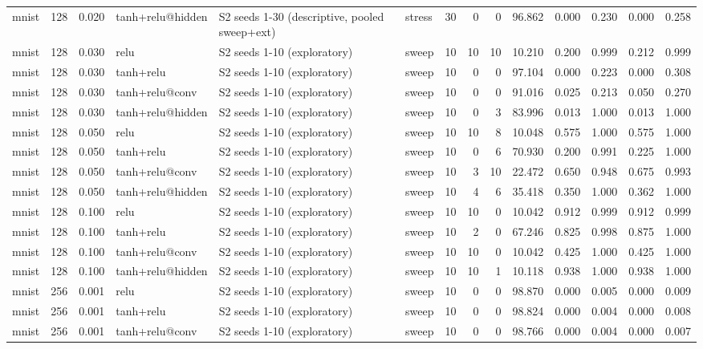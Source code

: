 \begin{table}[htbp]
{\begin{tabular}{@{}lrrlllrrrrrrrr@{}}
mnist & 128 & 0.020 & tanh+relu@hidden & S2 seeds 1-30 (descriptive, pooled sweep+ext) & stress & 30 & 0 & 0 & 96.862 & 0.000 & 0.230 & 0.000 & 0.258 \\
mnist & 128 & 0.030 & relu & S2 seeds 1-10 (exploratory) & sweep & 10 & 10 & 10 & 10.210 & 0.200 & 0.999 & 0.212 & 0.999 \\
mnist & 128 & 0.030 & tanh+relu & S2 seeds 1-10 (exploratory) & sweep & 10 & 0 & 0 & 97.104 & 0.000 & 0.223 & 0.000 & 0.308 \\
mnist & 128 & 0.030 & tanh+relu@conv & S2 seeds 1-10 (exploratory) & sweep & 10 & 0 & 0 & 91.016 & 0.025 & 0.213 & 0.050 & 0.270 \\
mnist & 128 & 0.030 & tanh+relu@hidden & S2 seeds 1-10 (exploratory) & sweep & 10 & 0 & 3 & 83.996 & 0.013 & 1.000 & 0.013 & 1.000 \\
mnist & 128 & 0.050 & relu & S2 seeds 1-10 (exploratory) & sweep & 10 & 10 & 8 & 10.048 & 0.575 & 1.000 & 0.575 & 1.000 \\
mnist & 128 & 0.050 & tanh+relu & S2 seeds 1-10 (exploratory) & sweep & 10 & 0 & 6 & 70.930 & 0.200 & 0.991 & 0.225 & 1.000 \\
mnist & 128 & 0.050 & tanh+relu@conv & S2 seeds 1-10 (exploratory) & sweep & 10 & 3 & 10 & 22.472 & 0.650 & 0.948 & 0.675 & 0.993 \\
mnist & 128 & 0.050 & tanh+relu@hidden & S2 seeds 1-10 (exploratory) & sweep & 10 & 4 & 6 & 35.418 & 0.350 & 1.000 & 0.362 & 1.000 \\
mnist & 128 & 0.100 & relu & S2 seeds 1-10 (exploratory) & sweep & 10 & 10 & 0 & 10.042 & 0.912 & 0.999 & 0.912 & 0.999 \\
mnist & 128 & 0.100 & tanh+relu & S2 seeds 1-10 (exploratory) & sweep & 10 & 2 & 0 & 67.246 & 0.825 & 0.998 & 0.875 & 1.000 \\
mnist & 128 & 0.100 & tanh+relu@conv & S2 seeds 1-10 (exploratory) & sweep & 10 & 10 & 0 & 10.042 & 0.425 & 1.000 & 0.425 & 1.000 \\
mnist & 128 & 0.100 & tanh+relu@hidden & S2 seeds 1-10 (exploratory) & sweep & 10 & 10 & 1 & 10.118 & 0.938 & 1.000 & 0.938 & 1.000 \\
mnist & 256 & 0.001 & relu & S2 seeds 1-10 (exploratory) & sweep & 10 & 0 & 0 & 98.870 & 0.000 & 0.005 & 0.000 & 0.009 \\
mnist & 256 & 0.001 & tanh+relu & S2 seeds 1-10 (exploratory) & sweep & 10 & 0 & 0 & 98.824 & 0.000 & 0.004 & 0.000 & 0.008 \\
mnist & 256 & 0.001 & tanh+relu@conv & S2 seeds 1-10 (exploratory) & sweep & 10 & 0 & 0 & 98.766 & 0.000 & 0.004 & 0.000 & 0.007 \\

\end{tabular}}
\end{table}
